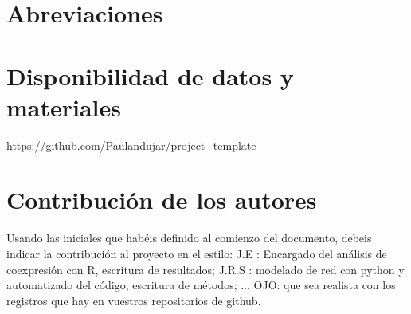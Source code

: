 \documentclass{bmcart}
\begin{document}
	
	
	
	
	
	
	
	
	
	
	\begin{backmatter}
	
		\section*{Abreviaciones}%
			
		
		\section*{Disponibilidad de datos y materiales}%
			https://github.com/Paulandujar/project\_template
		
		\section*{Contribución de los autores}
			Usando las iniciales que habéis definido al comienzo del documento, debeis indicar la contribución al proyecto en el estilo:
			J.E : Encargado del análisis de coexpresión con R, escritura de resultados; J.R.S : modelado de red con python y automatizado del código, escritura de métodos; ...
			OJO: que sea realista con los registros que hay en vuestros repositorios de github. 
		
		
		
	
	\end{backmatter}
\end{document}
